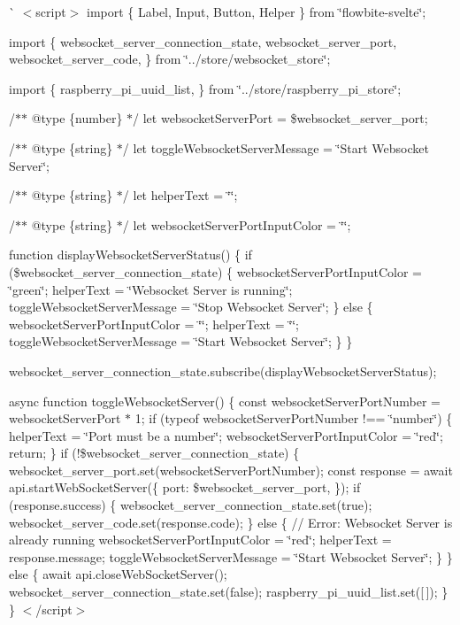 \`{} $<$script$>$ import \{ Label, Input, Button, Helper \} from \char`\"{}flowbite-\/svelte\char`\"{};

import \{ websocket\+\_\+server\+\_\+connection\+\_\+state, websocket\+\_\+server\+\_\+port, websocket\+\_\+server\+\_\+code, \} from \char`\"{}../store/websocket\+\_\+store\char`\"{};

import \{ raspberry\+\_\+pi\+\_\+uuid\+\_\+list, \} from \char`\"{}../store/raspberry\+\_\+pi\+\_\+store\char`\"{};

/$\ast$$\ast$ @type \{number\} $\ast$/ let websocket\+Server\+Port = \$websocket\+\_\+server\+\_\+port;

/$\ast$$\ast$ @type \{string\} $\ast$/ let toggle\+Websocket\+Server\+Message = \char`\"{}\+Start Websocket Server\char`\"{};

/$\ast$$\ast$ @type \{string\} $\ast$/ let helper\+Text = \char`\"{}\char`\"{};

/$\ast$$\ast$ @type \{string\} $\ast$/ let websocket\+Server\+Port\+Input\+Color = \char`\"{}\char`\"{};

function display\+Websocket\+Server\+Status() \{ if (\$websocket\+\_\+server\+\_\+connection\+\_\+state) \{ websocket\+Server\+Port\+Input\+Color = \char`\"{}green\char`\"{}; helper\+Text = \char`\"{}\+Websocket Server is running\char`\"{}; toggle\+Websocket\+Server\+Message = \char`\"{}\+Stop Websocket Server\char`\"{}; \} else \{ websocket\+Server\+Port\+Input\+Color = \char`\"{}\char`\"{}; helper\+Text = \char`\"{}\char`\"{}; toggle\+Websocket\+Server\+Message = \char`\"{}\+Start Websocket Server\char`\"{}; \} \}

websocket\+\_\+server\+\_\+connection\+\_\+state.\+subscribe(display\+Websocket\+Server\+Status);

async function toggle\+Websocket\+Server() \{ const websocket\+Server\+Port\+Number = websocket\+Server\+Port $\ast$ 1; if (typeof websocket\+Server\+Port\+Number !== \char`\"{}number\char`\"{}) \{ helper\+Text = \char`\"{}\+Port must be a number\char`\"{}; websocket\+Server\+Port\+Input\+Color = \char`\"{}red\char`\"{}; return; \} if (!\$websocket\+\_\+server\+\_\+connection\+\_\+state) \{ websocket\+\_\+server\+\_\+port.\+set(websocket\+Server\+Port\+Number); const response = await api.\+start\+Web\+Socket\+Server(\{ port\+: \$websocket\+\_\+server\+\_\+port, \}); if (response.\+success) \{ websocket\+\_\+server\+\_\+connection\+\_\+state.\+set(true); websocket\+\_\+server\+\_\+code.\+set(response.\+code); \} else \{ // Error\+: Websocket Server is already running websocket\+Server\+Port\+Input\+Color = \char`\"{}red\char`\"{}; helper\+Text = response.\+message; toggle\+Websocket\+Server\+Message = \char`\"{}\+Start Websocket Server\char`\"{}; \} \} else \{ await api.\+close\+Web\+Socket\+Server(); websocket\+\_\+server\+\_\+connection\+\_\+state.\+set(false); raspberry\+\_\+pi\+\_\+uuid\+\_\+list.\+set(\mbox{[}$\,$\mbox{]}); \} \} $<$/script$>$

